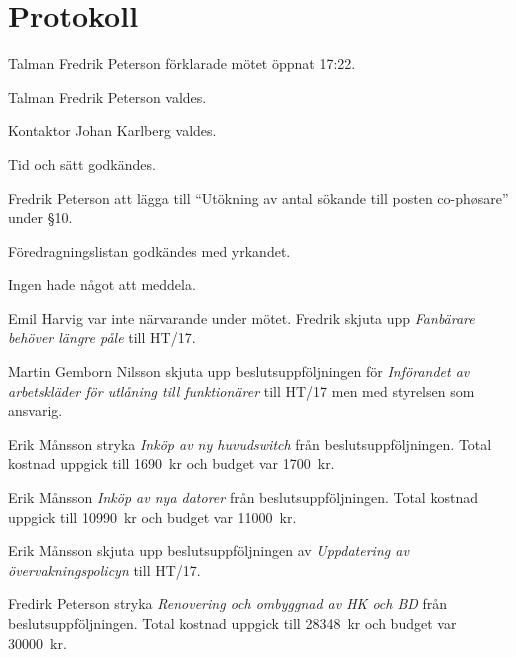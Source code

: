 \documentclass[10pt]{article}
\def\mo{Fredrik Peterson}
\def\ms{Johan Karlberg}
\begin{document}
\section*{Protokoll}
\begin{paragrafer}
Talman {\mo} förklarade mötet öppnat 17:22.

Talman {\mo} valdes.

Kontaktor {\ms} valdes.

Tid och sätt godkändes.

\valavj

\ingaadj

Fredrik Peterson \ypa att lägga till ``Utökning av antal sökande till posten co-phøsare'' under \S10.

Föredragningslistan godkändes med yrkandet.


Ingen hade något att meddela.

Emil Harvig var inte närvarande under mötet. Fredrik \ypa skjuta upp \emph{Fanbärare behöver längre påle} till HT/17.

\Mbaby

Martin Gemborn Nilsson \ypa skjuta upp beslutsuppföljningen för \emph{Införandet av arbetskläder för utlåning till funktionärer} till HT/17 men med styrelsen som ansvarig.

\Mbaby

Erik Månsson \ypa stryka \emph{Inköp av ny huvudswitch} från beslutsuppföljningen. Total kostnad uppgick till \SI{1690}{kr} och budget var \SI{1700}{kr}.

\Mbaby

Erik Månsson \ypa \emph{Inköp av nya datorer} från beslutsuppföljningen. Total kostnad uppgick till \SI{10990}{kr} och budget var \SI{11000}{kr}.

\Mbaby

Erik Månsson \ypa skjuta upp beslutsuppföljningen av \emph{Uppdatering av övervakningspolicyn} till HT/17.

\Mbaby

Fredirk Peterson \ypa stryka \emph{Renovering och ombyggnad av HK och BD} från beslutsuppföljningen. Total kostnad uppgick till \SI{28348}{kr} och budget var \SI{30000}{kr}.


\end{paragrafer}
\end{document}

